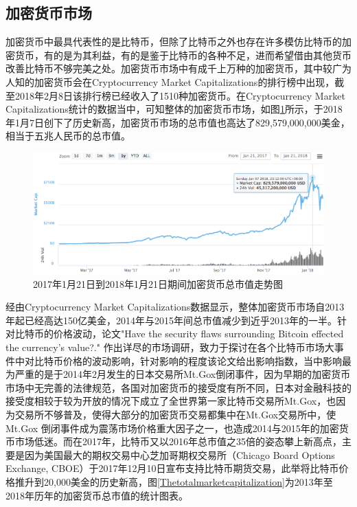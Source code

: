 		\subsection{加密货币市场}

		加密货币中最具代表性的是比特币，但除了比特币之外也存在许多模仿比特币的加密货币，有的是为其利益，有的是鉴于比特币的各种不足，进而希望借由其他货币改善⽐特币不够完美之处。加密货币市场中有成千上万种的加密货币，其中较广为人知的加密货币会在Cryptocurrency Market Capitalizations\supercite{CryptocurrencyMarketCapitalizations}的排行榜中出现，截至2018年2月8日该排行榜已经收入了1510种加密货币。在Cryptocurrency Market Capitalizations统计的数据当中，可知整体的加密货币市场，如图\ref{TotalMarketCapitalization}所示，于2018年1月7日创下了历史新高，加密货币市场的总市值也高达了829,579,000,000美金，相当于五兆人民币的总市值。

		\begin{figure}[!htbp]
			\centering
			\includegraphics[width = 1\textwidth]{TotalMarketCapitalization.png}
			\caption{2017年1月21日到2018年1月21日期间加密货币总市值走势图\supercite{CryptocurrencyMarketCapitalizations}}\label{TotalMarketCapitalization}
		\end{figure}

		经由Cryptocurrency Market Capitalizations数据显示，整体加密货币市场自2013年起已经高达150亿美金，2014年与2015年间总市值减少到近乎2013年的一半。针对比特币的价格波动，论文"Have the security flaws surrounding Bitcoin effected the currency's value?."
		\supercite{HavethesecurityflawssurroundingBITCOINeffectedthecurrencysvalue?}
		作出详尽的市场调研，致力于探讨在各个比特币市场大事件中对比特币价格的波动影响，针对影响的程度该论文给出影响指数，当中影响最为严重的是于2014年2月发生的日本交易所Mt.Gox倒闭事件，因为早期的加密货币市场中无完善的法律规范，各国对加密货币的接受度有所不同，日本对金融科技的接受度相较于较为开放的情况下成立了全世界第一家比特币交易所Mt.Gox，也因为交易所不够普及，使得大部分的加密货币交易都集中在Mt.Gox交易所中，使Mt.Gox 倒闭事件成为震荡市场价格重⼤因⼦之⼀，也造成2014与2015年的加密货币市场低迷。而在2017年，比特币又以2016年总市值之35倍的姿态攀上新高点，主要是因为美国最大的期权交易中心芝加哥期权交易所（Chicago Board Options Exchange, CBOE）于2017年12月10日宣布支持比特币期货交易，此举将比特币价格推升到20,000美金的历史新高，图\ref{Thetotalmarketcapitalization}为2013年至2018年历年的加密货币总市值的统计图表。

